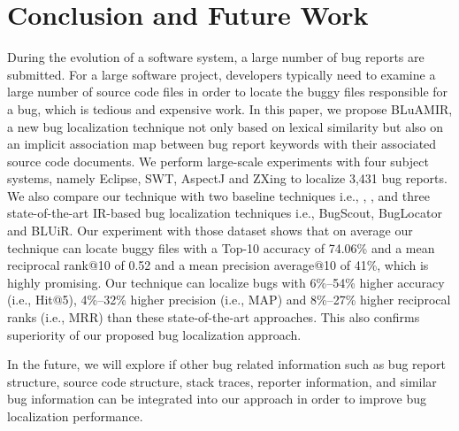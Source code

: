 \documentclass[sigconf,review,anonymous]{acmart}
\begin{document}
\section{Conclusion and Future Work} \label{sec:conclusionANDfuture}
During the evolution of a software system, a large number of bug reports are submitted. For a large software project, developers typically need to examine a large number of source code files in order to locate the buggy files responsible for a bug, which is tedious and expensive work. In this paper, we propose BLuAMIR, a new bug localization technique not only based on lexical similarity but also on an implicit association map between bug report keywords with their associated source code documents. We perform large-scale experiments with four subject systems, namely Eclipse, SWT, AspectJ and ZXing to localize 3,431 bug reports.
We also compare our technique with two baseline techniques i.e., \cite{vector-space-model}, \cite{MarcusLSI}, and three state-of-the-art IR-based bug localization techniques i.e., BugScout\cite{Nguyen}, BugLocator\cite{Jian} and BLUiR\cite{Saha}.
Our experiment with those dataset shows that on average our technique can locate buggy files with a Top-10 accuracy of 74.06\% and a mean reciprocal rank@10 of 0.52 and a mean precision average@10 of 41\%, which is highly promising.   
Our technique can localize bugs with 6\%--54\% higher accuracy (i.e., Hit@5), 4\%--32\% higher precision (i.e., MAP) and 8\%--27\% higher reciprocal ranks (i.e., MRR) than these state-of-the-art approaches. This also confirms superiority of our proposed bug localization approach. 

In the future, we will explore if other bug related information such as bug report structure, source code structure, stack traces, reporter information, and similar bug information can be integrated into our approach in order to improve bug localization performance.

\balance


%


\end{document}
